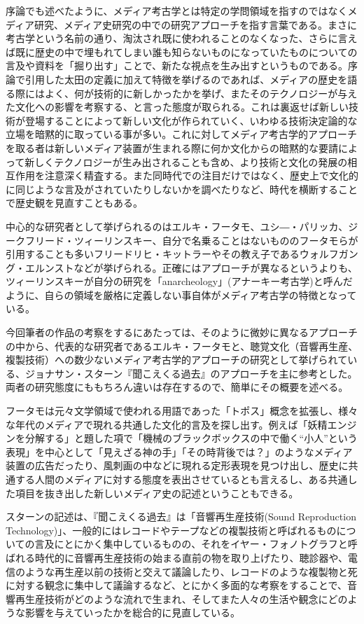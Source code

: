 \documentclass[a4paper,report]{jsbook}
\begin{document}
序論でも述べたように、メディア考古学とは特定の学問領域を指すのではなくメディア研究、メディア史研究の中での研究アプローチを指す言葉である。まさに考古学という名前の通り、淘汰され既に使われることのなくなった、さらに言えば既に歴史の中で埋もれてしまい誰も知らないものになっていたものについての言及や資料を「掘り出す」ことで、新たな視点を生み出すというものである。序論で引用した太田の定義に加えて特徴を挙げるのであれば、メディアの歴史を語る際にはよく、何が技術的に新しかったかを挙げ、またそのテクノロジーが与えた文化への影響を考察する、と言った態度が取られる。これは裏返せば新しい技術が登場することによって新しい文化が作られていく、いわゆる技術決定論的な立場を暗黙的に取っている事が多い。これに対してメディア考古学的アプローチを取る者は新しいメディア装置が生まれる際に何か文化からの暗黙的な要請によって新しくテクノロジーが生み出されることも含め、より技術と文化の発展の相互作用を注意深く精査する。また同時代での注目だけではなく、歴史上で文化的に同じような言及がされていたりしないかを調べたりなど、時代を横断することで歴史観を見直すこともある。

中心的な研究者として挙げられるのはエルキ・フータモ、ユシ―・パリッカ、ジークフリード・ツィーリンスキー、自分で名乗ることはないもののフータモらが引用することも多いフリードリヒ・キットラーやその教え子であるウォルフガング・エルンストなどが挙げられる。正確にはアプローチが異なるというよりも、ツィーリンスキーが自分の研究を「anarcheology」(アナーキー考古学)と呼んだように、自らの領域を厳格に定義しない事自体がメディア考古学の特徴となっている。

今回筆者の作品の考察をするにあたっては、そのように微妙に異なるアプローチの中から、代表的な研究者であるエルキ・フータモと、聴覚文化（音響再生産、複製技術）への数少ないメディア考古学的アプローチの研究として挙げられている\autocite{ohta:mediaarch}、ジョナサン・スターン『聞こえくる過去』\autocite{o_audiblepast}のアプローチを主に参考とした。両者の研究態度にももちろん違いは存在するので、簡単にその概要を述べる。

フータモは元々文学領域で使われる用語であった「トポス」概念を拡張し、様々な年代のメディアで現れる共通した文化的言及を探し出す。例えば「妖精エンジンを分解する」と題した項で「機械のブラックボックスの中で働く``小人''という表現」を中心として「見えざる神の手」「その時背後では？」のようなメディア装置の広告だったり、風刺画の中などに現れる定形表現を見つけ出し、歴史に共通する人間のメディアに対する態度を表出させているとも言えるし、ある共通した項目を抜き出した新しいメディア史の記述ということもできる。

スターンの記述は、『聞こえくる過去』は「音響再生産技術(Sound
Reproduction
Technology)」、一般的にはレコードやテープなどの複製技術と呼ばれるものについての言及にとにかく集中しているものの、それをイヤー・フォノトグラフと呼ばれる時代的に音響再生産技術の始まる直前の物を取り上げたり、聴診器や、電信のような再生産以前の技術と交えて議論したり、レコードのような複製物と死に対する観念に集中して議論するなど、とにかく多面的な考察をすることで、音響再生産技術がどのような流れで生まれ、そしてまた人々の生活や観念にどのような影響を与えていったかを総合的に見直している。
\end{document}
